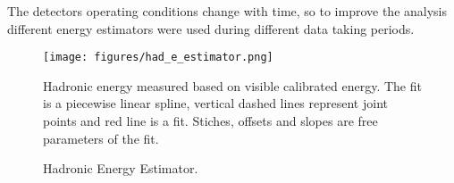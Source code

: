 The detectors operating conditions change with time, so to improve the analysis different energy estimators were used
during different data taking periods.
\begin{figure}[t]
\texttt{[image: figures/had\_e\_estimator.png]}
\centering
\caption{Hadronic Energy Estimator.}
{Hadronic energy measured based on visible calibrated energy. The fit is a piecewise linear spline, vertical 
dashed lines represent joint points and red line is a fit. Stiches, offsets and slopes are free parameters of the
fit.}
\label{fig:hade_fit}
\end{figure}
